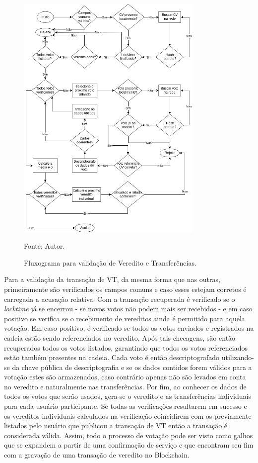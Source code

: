 \begin{figure}[ht!]
\caption{Fluxograma para validação de Veredito e Transferências.}
\centering
\includegraphics[width=0.8\textwidth]{imagens/validacao_vt.png}
\begin{center}
        Fonte: Autor.
\end{center}
\label{fig:validacao_vt}
\end{figure}

Para a validação da transação de \ac{VT}, da mesma forma que nas outras, primeiramente são verificados os campos comuns e caso esses estejam corretos é carregada a acusação relativa. Com a transação recuperada é verificado se o \textit{locktime} já se encerrou - se novos votos não podem mais ser recebidos - e em caso positivo se verifica se o recebimento de vereditos ainda é permitido para aquela votação. Em caso positivo, é verificado se todos os votos enviados e registrados na cadeia estão sendo referenciados no veredito. Após tais checagens, são então recuperados todos os votos listados, garantindo que todos os votos referenciados estão também presentes na cadeia. Cada voto é então descriptografado utilizando-se da chave pública de descriptografia e se os dados contidos forem válidos para a votação estes são armazenados, caso contrário apenas não são levados em conta no veredito e naturalmente nas transferências. Por fim, ao conhecer os dados de todos os votos que serão usados, gera-se o veredito e as transferências individuais para cada usuário participante. Se todas as verificações resultarem em sucesso e os vereditos individuais calculados na verificação coincidirem com os previamente listados pelo usuário que publicou a transação de \ac{VT} então a transação é considerada válida.
%
Assim, todo o processo de votação pode ser visto como galhos que se expandem a partir de uma confirmação de serviço e que encontram seu fim com a gravação de uma transação de veredito no Blockchain.

